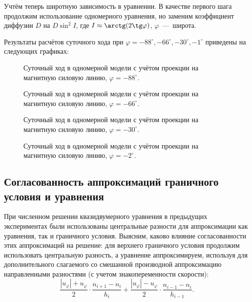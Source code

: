 \documentclass[14pt, a4paper, fleqn]{extarticle}
\begin{document}
Учтём теперь широтную зависимость в уравнении. В качестве первого шага продолжим использование одномерного уравнения, но заменим коэффициент диффузии $D$ на $D\sin^2I$, где $I\approx \arctg(2\tg \varphi)$, $\varphi$~---~широта.

Результаты расчётов суточного хода при $\varphi = -88^\circ, -66^\circ, -30^\circ, -1^\circ$ приведены на следующих графиках:

\begin{figure}[H]
\caption{Суточный ход в одномерной модели с учётом проекции на магнитную силовую линию, $\varphi = -88^\circ$.}
\end{figure}

\begin{figure}[H]
\caption{Суточный ход в одномерной модели с учётом проекции на магнитную силовую линию, $\varphi = -66^\circ$.}
\end{figure}

\begin{figure}[H]
\caption{Суточный ход в одномерной модели с учётом проекции на магнитную силовую линию, $\varphi = -30^\circ$.}
\end{figure}

\begin{figure}[H]
\caption{Суточный ход в одномерной модели с учётом проекции на магнитную силовую линию, $\varphi = -2^\circ$.}
\end{figure}



\subsection{Согласованность аппроксимаций граничного условия и уравнения}

При численном решении квазидвумерного уравнения в предыдущих экспериментах были использованы центральные разности для аппроксимации как уравнения, так и граничного условия. Выясним, каково влияние согласованности этих аппроксимаций на решение: для верхнего граничного условия продолжим использовать центральную разность, а уравнение аппроксимируем, используя для дополнительного слагаемого со смешанной производной аппроксимацию направленными разностями (с учетом знакопеременности скорости): $$\dfrac{|u_\varphi|+u_\varphi}{2}\cdot\dfrac{n_{i+1}-n_i}{h_i} + \dfrac{|u_\varphi|-u_\varphi}{2}\cdot\dfrac{n_{i-1}-n_i}{h_{i-1}}.$$
\end{document}
